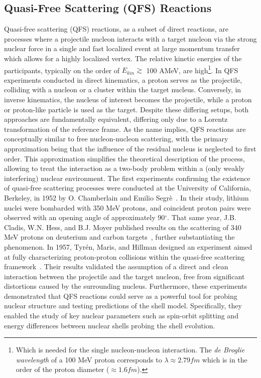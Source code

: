 \subsection{Quasi-Free Scattering (QFS) Reactions}\label{sec:qfs_theo}
Quasi-free scattering (QFS) reactions, as a subset of direct reactions, are processes where a projectile nucleon interacts with a target nucleon via the strong nuclear force in a single and fast localized event at large momentum transfer which allows for a highly localized vertex. The relative kinetic energies of the participants, typically on the order of  $E_{kin}\gtrsim$ 100 AMeV, are high\footnote{Which is needed for the single nucleon-nucleon interaction. The \textit{de Broglie wavelength} of a 100 MeV proton corresponds to $\lambda \approx 2.79fm$ which is in the order of the proton diameter ($\approx 1.6 fm$).}.\newline
In QFS experiments conducted in direct kinematics, a proton serves as the projectile, colliding with a nucleon or a cluster within the target nucleus. Conversely, in inverse kinematics, the nucleus of interest becomes the projectile, while a proton or proton-like particle is used as the target. Despite these differing setups, both approaches are fundamentally equivalent, differing only due to a Lorentz transformation of the reference frame.\newline
As the name implies, QFS reactions are conceptually similar to free nucleon-nucleon scattering, with the primary approximation being that the influence of the residual nucleus is neglected to first order. This approximation simplifies the theoretical description of the process, allowing to treat the interaction as a two-body problem within a (only weakly interfering) nuclear environment.\newline
The first experiments confirming the existence of quasi-free scattering processes were conducted at the University of California, Berkeley, in 1952 by O. Chamberlain and Emilio Segr\`e~\cite{chamberlain1952proton}. In their study, lithium nuclei were bombarded with 350 MeV protons, and coincident proton pairs were observed with an opening angle of approximately 90$^{\circ}$. That same year, J.B. Cladis, W.N. Hess, and B.J. Moyer published results on the scattering of 340 MeV protons on deuterium and carbon targets~\cite{cladis1952nucleon}, further substantiating the phenomenon.\newline
In 1957, Tyr\'en, Maris, and Hillman designed an experiment aimed at fully characterizing proton-proton collisions within the quasi-free scattering framework~\cite{MARIS19581}. Their results validated the assumption of a direct and clean interaction between the projectile and the target nucleon, free from significant distortions caused by the surrounding nucleus. Furthermore, these experiments demonstrated that QFS reactions could serve as a powerful tool for probing nuclear structure and testing predictions of the shell model. Specifically, they enabled the study of key nuclear parameters such as spin-orbit splitting and energy differences between nuclear shells probing the shell evolution. \newline

